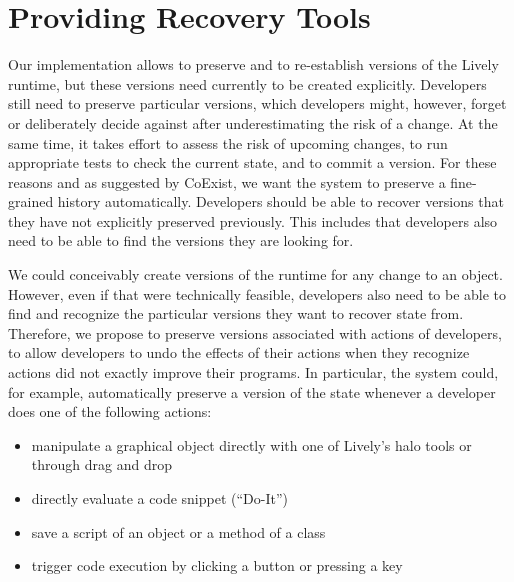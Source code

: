\section{Providing Recovery Tools}

Our implementation allows to preserve and to re-establish versions of the Lively runtime, but these versions need currently to be created explicitly.
Developers still need to preserve particular versions, which developers might, however, forget or deliberately decide against after underestimating the risk of a change.
At the same time, it takes effort to assess the risk of upcoming changes, to run appropriate tests to check the current state, and to commit a version.
For these reasons and as suggested by CoExist, we want the system to preserve a fine-grained history automatically.
Developers should be able to recover versions that they have not explicitly preserved previously.
This includes that developers also need to be able to find the versions they are looking for.

We could conceivably create versions of the runtime for any change to an object.
However, even if that were technically feasible, developers also need to be able to find and recognize the particular versions they want to recover state from.
Therefore, we propose to preserve versions associated with actions of developers, to allow developers to undo the effects of their actions when they recognize actions did not exactly improve their programs.
In particular, the system could, for example, automatically preserve a version of the state whenever a developer does one of the following actions:
\begin{itemize}
    \item manipulate a graphical object directly with one of Lively's halo tools or through drag and drop
    \item directly evaluate a code snippet (``Do-It'')
    \item save a script of an object or a method of a class
    \item trigger code execution by clicking a button or pressing a key
\end{itemize}

